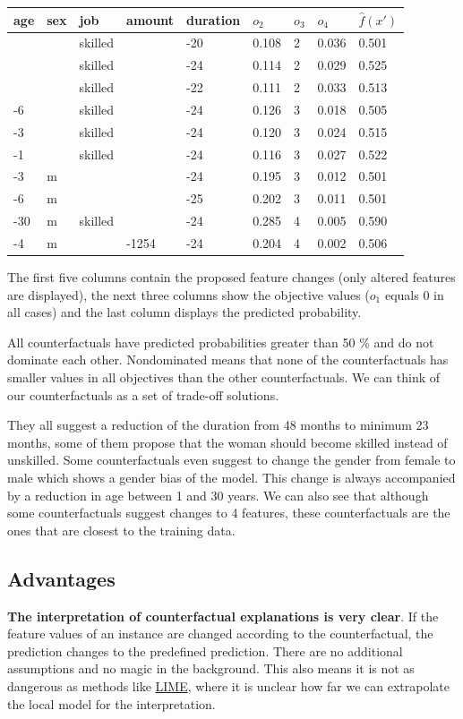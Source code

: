 \documentclass[12pt,]{krantz}
\begin{document}
\begin{longtable}[]{@{}lllllllll@{}}
\toprule
age & sex & job & amount & duration & \(o_2\) & \(o_3\) & \(o_4\) &
\(\hat{f}(x')\)\tabularnewline
\midrule
\endhead
& & skilled & & -20 & 0.108 & 2 & 0.036 & 0.501\tabularnewline
& & skilled & & -24 & 0.114 & 2 & 0.029 & 0.525\tabularnewline
& & skilled & & -22 & 0.111 & 2 & 0.033 & 0.513\tabularnewline
-6 & & skilled & & -24 & 0.126 & 3 & 0.018 & 0.505\tabularnewline
-3 & & skilled & & -24 & 0.120 & 3 & 0.024 & 0.515\tabularnewline
-1 & & skilled & & -24 & 0.116 & 3 & 0.027 & 0.522\tabularnewline
-3 & m & & & -24 & 0.195 & 3 & 0.012 & 0.501\tabularnewline
-6 & m & & & -25 & 0.202 & 3 & 0.011 & 0.501\tabularnewline
-30 & m & skilled & & -24 & 0.285 & 4 & 0.005 & 0.590\tabularnewline
-4 & m & & -1254 & -24 & 0.204 & 4 & 0.002 & 0.506\tabularnewline
\bottomrule
\end{longtable}

The first five columns contain the proposed feature changes (only
altered features are displayed), the next three columns show the
objective values (\(o_1\) equals 0 in all cases) and the last column
displays the predicted probability.

All counterfactuals have predicted probabilities greater than 50 \% and
do not dominate each other. Nondominated means that none of the
counterfactuals has smaller values in all objectives than the other
counterfactuals. We can think of our counterfactuals as a set of
trade-off solutions.

They all suggest a reduction of the duration from 48 months to minimum
23 months, some of them propose that the woman should become skilled
instead of unskilled. Some counterfactuals even suggest to change the
gender from female to male which shows a gender bias of the model. This
change is always accompanied by a reduction in age between 1 and 30
years. We can also see that although some counterfactuals suggest
changes to 4 features, these counterfactuals are the ones that are
closest to the training data.

\subsection{Advantages}\label{advantages-14}

\textbf{The interpretation of counterfactual explanations is very
clear}. If the feature values of an instance are changed according to
the counterfactual, the prediction changes to the predefined prediction.
There are no additional assumptions and no magic in the background. This
also means it is not as dangerous as methods like
\protect\hyperlink{lime}{LIME}, where it is unclear how far we can
extrapolate the local model for the interpretation.
\end{document}
